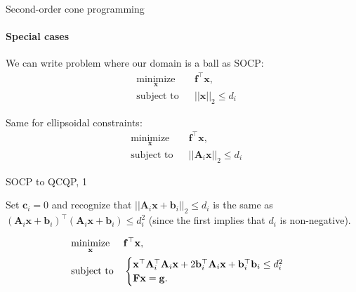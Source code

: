 \documentclass{beamer}
\begin{document}
\begin{frame}{Second-order cone programming}
\framesubtitle{Special cases}
\begin{flushleft}

We can write problem where our domain is a ball as SOCP:
%
\begin{equation}
\begin{aligned}
& \underset{\mathbf{x}}{\text{minimize}}
& & \mathbf{f}^\top\mathbf{x}, \\
& \text{subject to}
& & ||\mathbf{x}||_2 \leq d_i
\end{aligned}
\end{equation}

\bigskip

Same for ellipsoidal constraints:
%
\begin{equation}
\begin{aligned}
& \underset{\mathbf{x}}{\text{minimize}}
& & \mathbf{f}^\top\mathbf{x}, \\
& \text{subject to}
& & ||\mathbf{A}_i\mathbf{x}||_2 \leq d_i
\end{aligned}
\end{equation}
 
\end{flushleft}
\end{frame}




\begin{frame}{SOCP to QCQP, 1}
\begin{flushleft}

Set $\mathbf{c}_i = 0$ and recognize that $||\mathbf{A}_i\mathbf{x} + \mathbf{b}_i||_2 \leq d_i$ is the same as $(\mathbf{A}_i\mathbf{x} + \mathbf{b}_i)^\top (\mathbf{A}_i\mathbf{x} + \mathbf{b}_i) \leq d_i^2$ (since the first implies that $d_i$ is non-negative).

\bigskip
%
\begin{equation}
\begin{aligned}
& \underset{\mathbf{x}}{\text{minimize}}
& & \mathbf{f}^\top\mathbf{x}, \\
& \text{subject to}
& & \begin{cases}
    \mathbf{x}^\top \mathbf{A}_i^\top \mathbf{A}_i \mathbf{x} + 
    2 \mathbf{b}_i^\top \mathbf{A}_i\mathbf{x} + 
    \mathbf{b}_i^\top \mathbf{b}_i  \leq d_i^2\\
    \mathbf{F}\mathbf{x} = \mathbf{g}.
    \end{cases}
\end{aligned}
\end{equation}

\end{flushleft}
\end{frame}
\end{document}
